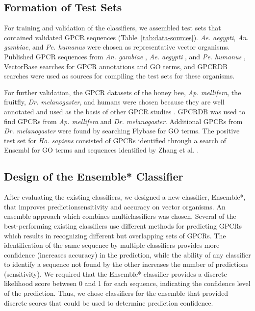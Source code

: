 \subsection{Formation of Test Sets}

For training and validation of the classifiers, we assembled test sets that contained validated GPCR sequences (Table~\ref{tab:data-sources}).  \emph{Ae. aegypti}, \emph{An. gambiae}, and \emph{Pe. humanus} were chosen as representative vector organisms.   Published GPCR sequences from \emph{An. gambiae} \cite{Hill2002, Holt2002},  \emph{Ae. aegypti} \cite{Nene2007}, and \emph{Pe. humanus} \cite{Kirkness2010}, VectorBase \cite{Lawson2007, Lawson2009} searches for GPCR annotations and GO terms, and GPCRDB \cite{Horn2003,Vroling2011} searches were used as sources for compiling the test sets for these organisms.

For further validation, the GPCR datasets of the honey bee, \emph{Ap. mellifera}, the fruitfly, \emph{Dr. melanogaster}, and humans were chosen because they are well annotated and used as the basis of other GPCR studies \cite{Bjarnadottir2004, Bjarnadottir2006, Fredriksson2003,Fredriksson2005, Gloriam2005, Haitina2009, Lagerstrom2006, Metpally2005, Metpally2005a, Vassilatis2003, Zhang2002, Zozulya2001}. GPCRDB was used to find GPCRs from \emph{Ap. mellifera} and \emph{Dr. melanogaster}. Additional GPCRs from \emph{Dr. melanogaster} were found by searching Flybase \cite{Adams2000, Gelbart1997, Crosby2007, Tweedie2009, McQuilton2011} for GO terms. The positive test set for \emph{Ho. sapiens} consisted of GPCRs identified through a search of Ensembl \cite{Hubbard2002} for GO terms and sequences identified by Zhang et al. \cite{Zhang2006}.

\subsection{Design of the Ensemble* Classifier}
After evaluating the existing classifiers, we designed a new classifier, Ensemble*, that improves predictionsensitivity and accuracy on vector organisms.
An ensemble approach which combines multiclassifiers was chosen.
Several of the best-performing existing classifiers use different methods for predicting GPCRs which results in recognizing different but overlapping sets of GPCRs.
The identification of the same sequence by multiple classifiers provides more confidence (increases accuracy) in the prediction, while the ability of any classifier to identify a sequence not found by the other increases the number of predictions (sensitivity).
We required that the Ensemble* classifier provides a discrete likelihood score between 0 and 1 for each sequence, indicating the confidence level of the prediction.
Thus, we chose classifiers for the ensemble that provided discrete scores that could be used to determine prediction confidence.

